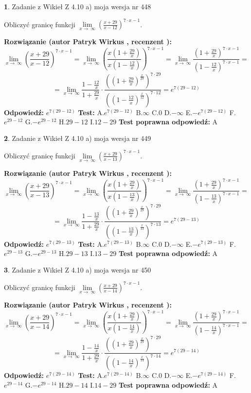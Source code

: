 \documentclass[12pt, a4paper]{article}
\theoremstyle{definition} %
\newtheorem{zad}{}
\newcommand{\zadStart}[1]{\begin{zad}#1\newline}
\newcommand{\zadStop}{\end{zad}}
\newcommand{\rozwStart}[2]{\noindent \textbf{Rozwiązanie (autor #1 , recenzent #2): }\newline}
\newcommand{\rozwStop}{\newline}
\newcommand{\odpStart}{\noindent \textbf{Odpowiedź:}\newline}
\newcommand{\odpStop}{\newline}
\newcommand{\testStart}{\noindent \textbf{Test:}\newline}
\newcommand{\testStop}{\newline}
\newcommand{\kluczStart}{\noindent \textbf{Test poprawna odpowiedź:}\newline}
\newcommand{\kluczStop}{\newline}
\begin{document}
\zadStart{Zadanie z Wikieł Z 4.10 a) moja wersja nr 448}


Obliczyć granicę funkcji  $\lim\limits_{x\to\ \infty}(\frac{x+29}{x-12})^{7\cdot x-1}$.
\zadStop
\rozwStart{Patryk Wirkus}{}
$$\lim\limits_{x\to\ \infty}(\frac{x+29}{x-12})^{7\cdot x-1} = \lim\limits_{x\to\ \infty}(\frac{x(1+\frac{29}{x})}{x(1-\frac{12}{x})})^{7\cdot x-1}=\lim\limits_{x\to\ \infty}\frac{(1+\frac{29}{x})^{7\cdot x-1}}{(1-\frac{12}{x})^{7\cdot x-1}}=$$
$$=\lim\limits_{x\to\ \infty}\frac{1-\frac{12}{x}}{1+\frac{29}{x}}\cdot\frac{((1+\frac{29}{x})^{\frac{x}{29}})^{7\cdot29}}{((1-\frac{12}{x})^{\frac{x}{12}})^{7\cdot12}}=e^{7(29-12)}$$
\rozwStop
\odpStart
$e^{7(29-12)}$
\odpStop
\testStart
A.$e^{7(29-12)}$ B.$\infty$ C.$0$ D.$-\infty$ E.$-e^{7(29-12)}$
F.$e^{29-12}$ G.$-e^{29-12}$
H.$29-12$
I.$12-29$
\testStop
\kluczStart
A
\kluczStop



\zadStart{Zadanie z Wikieł Z 4.10 a) moja wersja nr 449}


Obliczyć granicę funkcji  $\lim\limits_{x\to\ \infty}(\frac{x+29}{x-13})^{7\cdot x-1}$.
\zadStop
\rozwStart{Patryk Wirkus}{}
$$\lim\limits_{x\to\ \infty}(\frac{x+29}{x-13})^{7\cdot x-1} = \lim\limits_{x\to\ \infty}(\frac{x(1+\frac{29}{x})}{x(1-\frac{13}{x})})^{7\cdot x-1}=\lim\limits_{x\to\ \infty}\frac{(1+\frac{29}{x})^{7\cdot x-1}}{(1-\frac{13}{x})^{7\cdot x-1}}=$$
$$=\lim\limits_{x\to\ \infty}\frac{1-\frac{13}{x}}{1+\frac{29}{x}}\cdot\frac{((1+\frac{29}{x})^{\frac{x}{29}})^{7\cdot29}}{((1-\frac{13}{x})^{\frac{x}{13}})^{7\cdot13}}=e^{7(29-13)}$$
\rozwStop
\odpStart
$e^{7(29-13)}$
\odpStop
\testStart
A.$e^{7(29-13)}$ B.$\infty$ C.$0$ D.$-\infty$ E.$-e^{7(29-13)}$
F.$e^{29-13}$ G.$-e^{29-13}$
H.$29-13$
I.$13-29$
\testStop
\kluczStart
A
\kluczStop



\zadStart{Zadanie z Wikieł Z 4.10 a) moja wersja nr 450}


Obliczyć granicę funkcji  $\lim\limits_{x\to\ \infty}(\frac{x+29}{x-14})^{7\cdot x-1}$.
\zadStop
\rozwStart{Patryk Wirkus}{}
$$\lim\limits_{x\to\ \infty}(\frac{x+29}{x-14})^{7\cdot x-1} = \lim\limits_{x\to\ \infty}(\frac{x(1+\frac{29}{x})}{x(1-\frac{14}{x})})^{7\cdot x-1}=\lim\limits_{x\to\ \infty}\frac{(1+\frac{29}{x})^{7\cdot x-1}}{(1-\frac{14}{x})^{7\cdot x-1}}=$$
$$=\lim\limits_{x\to\ \infty}\frac{1-\frac{14}{x}}{1+\frac{29}{x}}\cdot\frac{((1+\frac{29}{x})^{\frac{x}{29}})^{7\cdot29}}{((1-\frac{14}{x})^{\frac{x}{14}})^{7\cdot14}}=e^{7(29-14)}$$
\rozwStop
\odpStart
$e^{7(29-14)}$
\odpStop
\testStart
A.$e^{7(29-14)}$ B.$\infty$ C.$0$ D.$-\infty$ E.$-e^{7(29-14)}$
F.$e^{29-14}$ G.$-e^{29-14}$
H.$29-14$
I.$14-29$
\testStop
\kluczStart
A
\kluczStop
\end{document}
